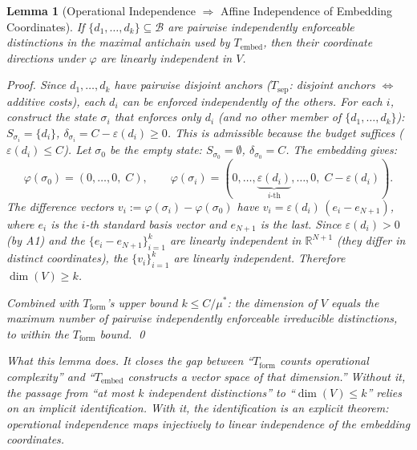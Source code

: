 \documentclass[11pt,a4paper]{article}
\newtheorem{lemma}[theorem]{Lemma}
\theoremstyle{definition}
\newcommand{\eps}{\varepsilon}
\begin{document}
\begin{lemma}[Operational Independence $\Rightarrow$ Affine Independence of Embedding Coordinates]\label{lem:affine_indep}
If $\{d_1, \ldots, d_k\} \subseteq \mathcal{B}$ are pairwise independently enforceable distinctions in the maximal antichain used by $T_{\mathrm{embed}}$, then their coordinate directions under $\varphi$ are linearly independent in $V$.

\smallskip\noindent\textit{Proof.}  Since $d_1, \ldots, d_k$ have pairwise disjoint anchors ($T_{\mathrm{sep}}$: disjoint anchors $\Leftrightarrow$ additive costs), each $d_i$ can be enforced independently of the others.  For each $i$, construct the state $\sigma_i$ that enforces only $d_i$ (and no other member of $\{d_1, \ldots, d_k\}$): $S_{\sigma_i} = \{d_i\}$, $\delta_{\sigma_i} = C - \eps(d_i) \ge 0$.  This is admissible because the budget suffices ($\eps(d_i) \le C$).  Let $\sigma_0$ be the empty state: $S_{\sigma_0} = \emptyset$, $\delta_{\sigma_0} = C$.  The embedding gives:
\[
\varphi(\sigma_0) = (0, \ldots, 0,\; C), \qquad \varphi(\sigma_i) = (0, \ldots, \underbrace{\eps(d_i)}_{i\text{-th}}, \ldots, 0,\; C - \eps(d_i)).
\]
The difference vectors $v_i := \varphi(\sigma_i) - \varphi(\sigma_0)$ have $v_i = \eps(d_i)\,(e_i - e_{N+1})$, where $e_i$ is the $i$-th standard basis vector and $e_{N+1}$ is the last.  Since $\eps(d_i) > 0$ (by A1) and the $\{e_i - e_{N+1}\}_{i=1}^k$ are linearly independent in $\mathbb{R}^{N+1}$ (they differ in distinct coordinates), the $\{v_i\}_{i=1}^k$ are linearly independent.  Therefore $\dim(V) \ge k$.

Combined with $T_{\mathrm{form}}$'s upper bound $k \le C/\mu^*$: the dimension of $V$ equals the maximum number of pairwise independently enforceable irreducible distinctions, to within the $T_{\mathrm{form}}$ bound.  \qed

\smallskip\noindent\textit{What this lemma does.}  It closes the gap between ``$T_{\mathrm{form}}$ counts operational complexity'' and ``$T_{\mathrm{embed}}$ constructs a vector space of that dimension.''  Without it, the passage from ``at most $k$ independent distinctions'' to ``$\dim(V) \le k$'' relies on an implicit identification.  With it, the identification is an explicit theorem: operational independence maps injectively to linear independence of the embedding coordinates.
\end{lemma}
\end{document}
